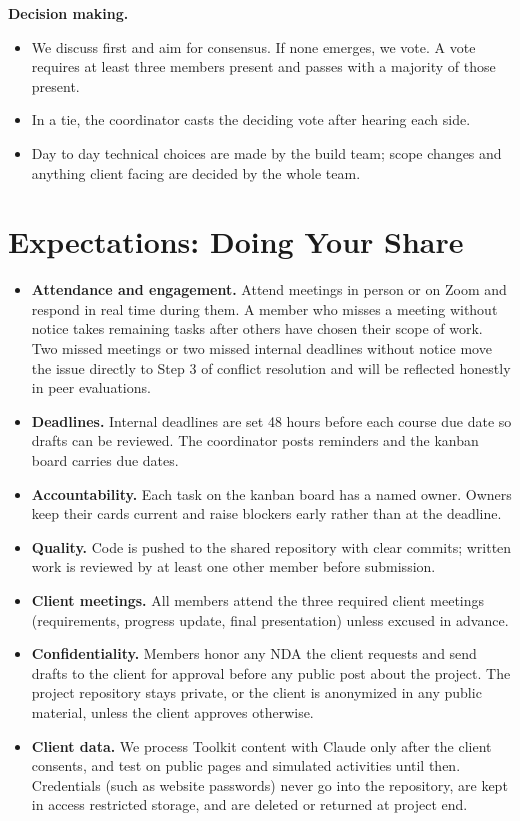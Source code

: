\documentclass[11pt]{article}
\begin{document}
\textbf{Decision making.}
\begin{itemize}
  \item We discuss first and aim for consensus. If none emerges, we vote. A vote requires at least three members present and passes with a majority of those present.
  \item In a tie, the coordinator casts the deciding vote after hearing each side.
  \item Day to day technical choices are made by the build team; scope changes and anything client facing are decided by the whole team.
\end{itemize}

\section{Expectations: Doing Your Share}

\begin{itemize}
  \item \textbf{Attendance and engagement.} Attend meetings in person or on Zoom and respond in real time during them. A member who misses a meeting without notice takes remaining tasks after others have chosen their scope of work. Two missed meetings or two missed internal deadlines without notice move the issue directly to Step 3 of conflict resolution and will be reflected honestly in peer evaluations.
  \item \textbf{Deadlines.} Internal deadlines are set 48 hours before each course due date so drafts can be reviewed. The coordinator posts reminders and the kanban board carries due dates.
  \item \textbf{Accountability.} Each task on the kanban board has a named owner. Owners keep their cards current and raise blockers early rather than at the deadline.
  \item \textbf{Quality.} Code is pushed to the shared repository with clear commits; written work is reviewed by at least one other member before submission.
  \item \textbf{Client meetings.} All members attend the three required client meetings (requirements, progress update, final presentation) unless excused in advance.
  \item \textbf{Confidentiality.} Members honor any NDA the client requests and send drafts to the client for approval before any public post about the project. The project repository stays private, or the client is anonymized in any public material, unless the client approves otherwise.
  \item \textbf{Client data.} We process Toolkit content with Claude only after the client consents, and test on public pages and simulated activities until then. Credentials (such as website passwords) never go into the repository, are kept in access restricted storage, and are deleted or returned at project end.
\end{itemize}
\end{document}
